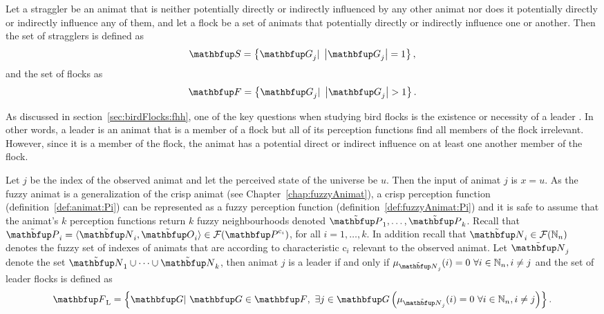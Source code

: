 Let a straggler be an animat that is neither potentially directly or indirectly influenced by any other animat nor does it potentially directly or indirectly influence any of them, and let a flock be a set of animats that potentially directly or indirectly influence one or another. Then the set of stragglers is defined as 
%
\begin{equation}
\set{S}=\left\{ \set{G}_j|\ \left|\set{G}_j\right|=1 \right\}, \label{eq:stragglers}
\end{equation}
%
and the set of flocks as
%
\begin{equation}
\set{F}=\left\{ \set{G}_j|\ \left|\set{G}_j\right|>1 \right\}. \label{eq:metric:flocks}
\end{equation}

As discussed in section~\ref{sec:birdFlocks:fhh}, one of the key questions when studying bird flocks is the existence or necessity of a leader \cite{heppner:1997}.  In other words, a leader is an animat that is a member of a flock but all of its perception functions find all members of the flock irrelevant. However, since it is a member of the flock, the animat has a potential direct or indirect influence on at least one another member of the flock. 

Let $j$ be the index of the observed animat and let the perceived state of the universe be $u$. Then the input of animat $j$ is $x=u$.
As the fuzzy animat is a generalization of the crisp animat (see Chapter~\ref{chap:fuzzyAnimat}), a crisp perception function (definition~\ref{def:animat:Pi}) can be represented as a fuzzy perception function (definition~\ref{def:fuzzyAnimat:Pi}) and it is safe to assume that the animat's $k$ perception functions return $k$ fuzzy neighbourhoods denoted $\fset{P}_1,\ldots,\fset{P}_k$. Recall that $\fset{P}_i=\langle\fset{N}_i,\fset{O}_i\rangle \in \fpowset{\set{P}^{\mathrm{c}_i}}$, for all $i=1,\ldots,k$. In addition recall that $\fset{N}_i \in \fpowset{\N_n}$ denotes the fuzzy set of indexes of animats that are according to characteristic $\mathrm{c}_i$ relevant to the observed animat. Let $\fset{N}_j$ denote the set $\fset{N}_1 \cup \cdots \cup \fset{N}_k$, then animat $j$ is a leader if and only if $\mu_{\fset{N}_j}(i)=0\ \forall i \in \N_n, i \neq j$ and the set of leader flocks is defined as 
%
\begin{equation}
\set{F}_\textnormal{L}=\left\{ \set{G}|\ \set{G} \in \set{F},\ \exists j \in \set{G}\left(\mu_{\fset{N}_j}(i)=0\ \forall i \in \N_n, i \neq j\right) \right\}. \label{eq:metric:FL}
\end{equation}

